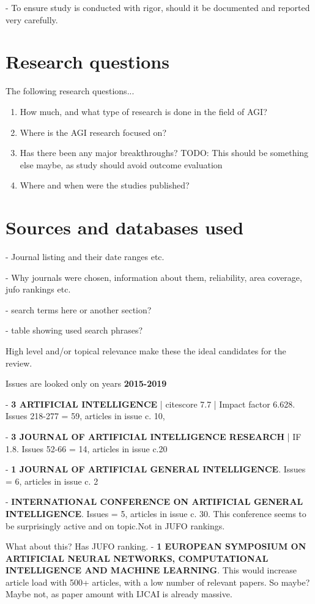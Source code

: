 \documentclass[utf8,english]{gradu3}
\begin{document}
- To ensure study is conducted with rigor, should it be documented and reported
very carefully.

\section{Research questions}

The following research questions...

\begin{enumerate}
  \item How much, and what type of research is done in the field of AGI?
  \item Where is the AGI research focused on?
  \item Has there been any major breakthroughs? TODO: This should be something else maybe, as study should avoid outcome evaluation
  \item Where and when were the studies published?
\end{enumerate}

\section{Sources and databases used}
- Journal listing and their date ranges etc.

- Why journals were chosen, information about them, reliability, area coverage,
jufo rankings etc.

- search terms here or another section? 

- table showing used search phrases?

High level and/or topical relevance make these the ideal candidates for the review.

Issues are looked only on years \textbf{2015-2019}

- \textbf{3 ARTIFICIAL INTELLIGENCE} | citescore 7.7 | Impact factor 6.628.
  Issues 218-277 = 59, articles in issue c. 10,

- \textbf{3 JOURNAL OF ARTIFICIAL INTELLIGENCE RESEARCH} | IF 1.8.
  Issues 52-66 = 14, articles in issue c.20

- \textbf{1 JOURNAL OF ARTIFICIAL GENERAL INTELLIGENCE}.
  Issues = 6, articles in issue c. 2

- \textbf{INTERNATIONAL CONFERENCE ON ARTIFICIAL GENERAL INTELLIGENCE}. Issues =
  5, articles in issue c. 30. This conference seems to be surprisingly active
  and on topic.Not in JUFO rankings.
  
  What about this? Has JUFO ranking. - \textbf{1 EUROPEAN SYMPOSIUM ON
ARTIFICIAL NEURAL NETWORKS, COMPUTATIONAL INTELLIGENCE AND MACHINE LEARNING}.
This would increase article load with 500+ articles, with a low number of
relevant papers. So maybe? Maybe not, as paper amount with IJCAI is already
massive.
\end{document}
